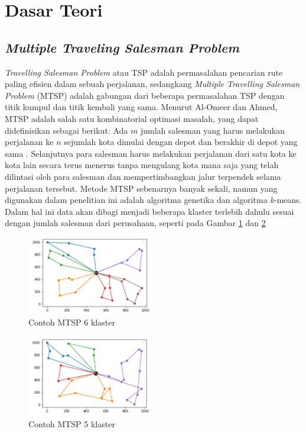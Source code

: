 \section{Dasar Teori}

\subsection{\textit{Multiple Traveling Salesman Problem}}

\textit{Travelling Salesman Problem} atau TSP adalah permasalahan pencarian rute paling efisien dalam sebuah perjalanan, sedangkang \textit{Multiple Travelling Salesman Problem} (MTSP) adalah gabungan dari beberapa permasalahan TSP dengan titik kumpul dan titik kembali yang sama. Menurut Al-Omeer dan Ahmed, MTSP adalah salah satu kombinatorial optimasi masalah, yang dapat didefinisikan sebagai berikut: Ada $m$ jumlah salesman yang harus melakukan perjalanan ke $n$ sejumlah kota dimulai dengan depot dan berakhir di depot yang sama \cite{al2019comparative}. Selanjutnya para salesman harus melakukan perjalanan dari satu kota ke kota lain secara terus menerus tanpa mengulang kota mana saja yang telah dilintasi oleh para salesman dan mempertimbangkan jalur terpendek selama perjalanan tersebut. Metode MTSP sebenarnya banyak sekali, namun yang digunakan dalam penelitian ini adalah algoritma genetika dan algoritma \textit{k}-means. Dalam hal ini data akan dibagi menjadi beberapa klaster terlebih dahulu sesuai dengan jumlah salesman dari perusahaan, seperti pada Gambar \ref{fig:mtsp6} dan \ref{fig:mtsp5}

\begin{figure}[H]
  \centering
  \includegraphics[width=0.5\textwidth]{Gambar/Picture1.png}
  \caption{Contoh MTSP 6 klaster}
  \label{fig:mtsp6}
\end{figure}

\begin{figure}[H]
  \centering
  \includegraphics[width=0.5\textwidth]{Gambar/Picture2.png}
  \caption{Contoh MTSP 5 klaster}
  \label{fig:mtsp5}
\end{figure}

